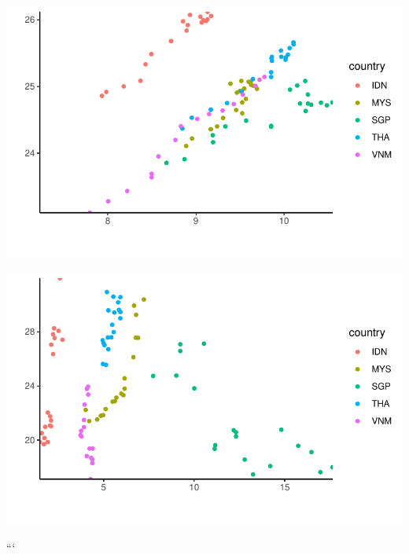 \documentclass[
  letterpaper,
  DIV=11,
  numbers=noendperiod]{scrartcl}
\begin{document}
\includegraphics{services_document_files/figure-pdf/unnamed-chunk-8-1.pdf}

\includegraphics{services_document_files/figure-pdf/unnamed-chunk-8-2.pdf}

```
\end{document}
